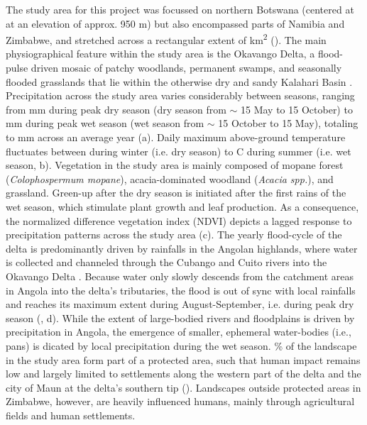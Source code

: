 \documentclass[abstract=on,10pt,a4paper,bibliography=totocnumbered]{article}
\newcommand{\inputy}[1]{\unskip}
\begin{document}
The study area for this project was focussed on northern Botswana (centered at
\inputy{GeneralMetrics/StudyAreaCenter.tex} at an elevation of approx. 950 m)
but also encompassed parts of Namibia and Zimbabwe, and stretched across a
rectangular extent of \inputy{GeneralMetrics/SizeStudyArea.tex}
km\textsuperscript{2} (). The main physiographical feature
within the study area is the Okavango Delta, a flood-pulse driven mosaic of
patchy woodlands, permanent swamps, and seasonally flooded grasslands that lie
within the otherwise dry and sandy Kalahari Basin \citep{Wilson.1976,
Ramberg.2006}. Precipitation across the study area varies considerably between
seasons, ranging from \inputy{GeneralMetrics/MinimumPrecipitation.tex} mm during
peak dry season (dry season from $\sim$ 15 May to 15 October) to
\inputy{GeneralMetrics/MaximumPrecipitation.tex} mm during peak wet season (wet
season from $\sim$ 15 October to 15 May), totaling to
\inputy{GeneralMetrics/TotalPrecipitation.tex} mm across an average year
(a). Daily maximum above-ground temperature fluctuates between
\inputy{GeneralMetrics/MinimumTemperature.tex} during winter (i.e. dry season)
to \inputy{GeneralMetrics/MaximumTemperature.tex}\degree C during summer (i.e.
wet season, b). Vegetation in the study area is mainly
composed of mopane forest (\textit{Colophospermum mopane}), acacia-dominated
woodland (\textit{Acacia spp.}), and grassland. Green-up after the dry season is
initiated after the first rains of the wet season, which stimulate plant growth
and leaf production. As a consequence, the normalized difference vegetation
index (NDVI) depicts a lagged response to precipitation patterns across the
study area (c). The yearly flood-cycle of the delta is
predominantly driven by rainfalls in the Angolan highlands, where water is
collected and channeled through the Cubango and Cuito rivers into the Okavango
Delta \citep{McCarthy.2003, Gumbricht.2004, Mendelsohn.2010}. Because water only
slowly descends from the catchment areas in Angola into the delta's tributaries,
the flood is out of sync with local rainfalls and reaches its maximum extent
during August-September, i.e. during peak dry season (\citealp{Wolski.2017},
d). While the extent of large-bodied rivers and floodplains is
driven by precipitation in Angola, the emergence of smaller, ephemeral
water-bodies (i.e., pans) is dicated by local precipitation during the wet
season. \inputy{GeneralMetrics/PercentageProtected.tex}\% of the landscape in
the study area form part of a protected area, such that human impact remains low
and largely limited to settlements along the western part of the delta and the
city of Maun at the delta's southern tip (). Landscapes outside
protected areas in Zimbabwe, however, are heavily influenced humans, mainly
through agricultural fields and human settlements.
\end{document}
